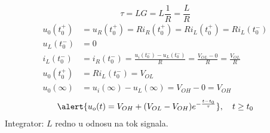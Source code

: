 \begin{frame}[label=08-s066]
\setlength{\parskip}{2pt}
\setlength{\abovedisplayskip}{4pt}\setlength{\belowdisplayskip}{4pt}
\[\tau=LG=L\frac1R=\frac LR\]
\begin{align*}
u_0(t_0^+)&=u_R(t_0^+)=Ri_R(t_0^+)=Ri_L(t_0^+)=Ri_L(t_0^-)\\
u_L(t_0^-)&=0\\
i_L(t_0^-)&=i_R(t_0^-)=\frac{u_i(t_0^-)-u_L(t_0^-)}R=\frac{V_{OL}-0}R=\frac{V_{OL}}R\\
u_0(t_0^+)&=Ri_L(t_0^-)=V_{OL}\\
u_0(\infty)&=u_i(\infty)-u_L(\infty)=V_{OH}-0=V_{OH}
\end{align*}
\[\alert{u_o(t)=V_{OH}+(V_{OL}-V_{OH})e^{-\frac{t-t_0}{\tau}}},\quad t\geq t_0\]
\centering Integrator: $L$ \alert{redno} u odnosu na tok signala.
\end{frame}
